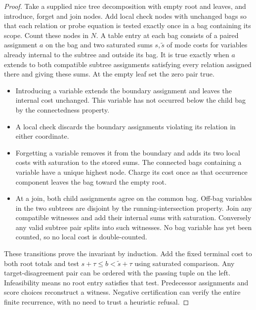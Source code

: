 \begin{proof}
Take a supplied nice tree decomposition with empty root and leaves, and introduce, forget and join nodes. Add local check nodes with unchanged bags so that each relation or probe equation is tested exactly once in a bag containing its scope. Count these nodes in \(N\). A table entry at each bag consists of a paired assignment \(a\) on the bag and two saturated sums \(s,\widetilde s\) of mode costs for variables already internal to the subtree and outside its bag. It is true exactly when \(a\) extends to both compatible subtree assignments satisfying every relation assigned there and giving these sums. At the empty leaf set the zero pair true.

\begin{itemize}

\item
  Introducing a variable extends the boundary assignment and leaves the internal cost unchanged. This variable has not occurred below the child bag by the connectedness property.
\item
  A local check discards the boundary assignments violating its relation in either coordinate.
\item
  Forgetting a variable removes it from the boundary and adds its two local costs with saturation to the stored sums. The connected bags containing a variable have a unique highest node. Charge its cost once as that occurrence component leaves the bag toward the empty root.
\item
  At a join, both child assignments agree on the common bag. Off-bag variables in the two subtrees are disjoint by the running-intersection property. Join any compatible witnesses and add their internal sums with saturation. Conversely any valid subtree pair splits into such witnesses. No bag variable has yet been counted, so no local cost is double-counted.
\end{itemize}

These transitions prove the invariant by induction. Add the fixed terminal cost to both root totals and test \(s+\tau\le b<\widetilde s+\tau\) using saturated comparison. Any target-disagreement pair can be ordered with the passing tuple on the left. Infeasibility means no root entry satisfies that test. Predecessor assignments and score choices reconstruct a witness. Negative certification can verify the entire finite recurrence, with no need to trust a heuristic refusal.


\end{proof}

